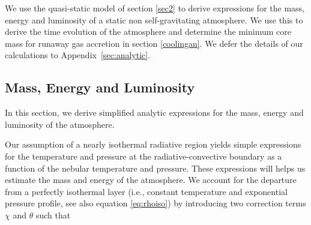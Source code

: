 \documentclass[apj]{emulateapj}
\newcommand{\App}[1]{Appendix~\ref{#1}}
\begin{document}
We use the quasi-static model of section \ref{sec2} to derive expressions for the mass, energy and luminosity of a static non self-gravitating atmosphere. We use this to derive the time evolution of the atmosphere and determine the minimum core mass for runaway gas accretion in section \ref{coolingan}. We defer the details of our calculations to \App{sec:analytic}.






\subsection{Mass, Energy and Luminosity}
\label{MELan}

In this section, we derive simplified analytic expressions for the mass, energy and luminosity of the atmosphere.

Our assumption of a nearly isothermal radiative region yields simple expressions for the temperature and pressure at the radiative-convective boundary as a function of the nebular temperature and pressure. These expressions will helps us estimate the mass and energy of the atmosphere. We account for the departure from a perfectly isothermal layer (i.e., constant temperature and exponential pressure profile, see also equation \ref{eq:rhoiso}) by introducing two correction terms $\chi$ and $\theta$ such that
\end{document}
